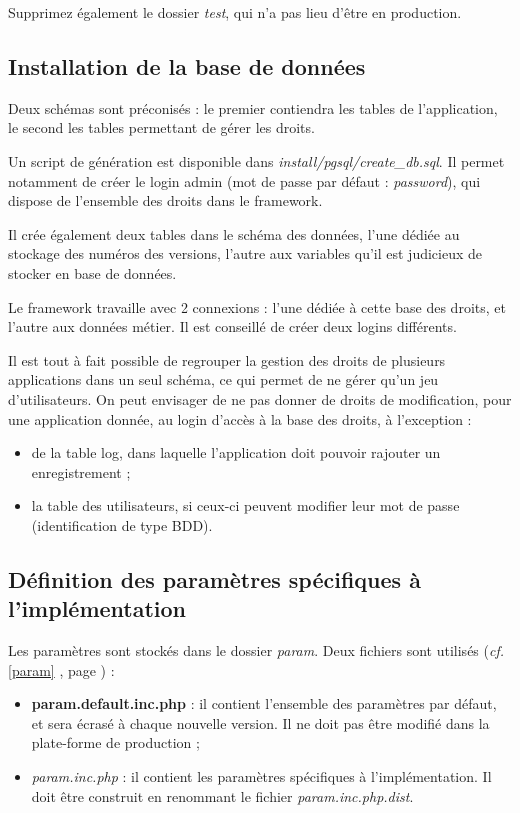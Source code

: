 Supprimez également le dossier \textit{test}, qui n'a pas lieu d'être en production.

\subsection{Installation de la base de données}

Deux schémas sont préconisés : le premier contiendra les tables de l'application, le second les tables permettant de gérer les droits.

Un script de génération est disponible dans \textit{install/pgsql/create\_db.sql}. Il permet notamment de créer le login admin (mot de passe par défaut : \textit{password}), qui dispose de l'ensemble des droits dans le framework.

Il crée également deux tables dans le schéma des données, l'une dédiée au stockage des numéros des versions, l'autre aux variables qu'il est judicieux de stocker en base de données.

Le framework travaille avec 2 connexions : l'une dédiée à cette base des droits, et l'autre aux données métier. Il est conseillé de créer deux logins différents.

Il est tout à fait possible de regrouper la gestion des droits de plusieurs applications dans un seul schéma, ce qui permet de ne gérer qu'un jeu d'utilisateurs. On peut envisager de ne pas donner de droits de modification, pour une application donnée, au login d'accès à la base des droits, à l'exception :
\begin{itemize}
\item de la table log, dans laquelle l'application doit pouvoir rajouter un enregistrement ;
\item la table des utilisateurs, si ceux-ci peuvent modifier leur mot de passe (identification de type BDD).
\end{itemize}

\subsection{Définition des paramètres spécifiques à l'implémentation}

Les paramètres sont stockés dans le dossier \textit{param}. Deux fichiers sont utilisés (\textit{cf.} \ref{param} \textit{}, page \pageref{param}) :
\begin{itemize}
\item \textbf{param.default.inc.php} : il contient l'ensemble des paramètres par défaut, et sera écrasé à chaque nouvelle version. Il ne doit pas être modifié dans la plate-forme de production ;
\item \textit{param.inc.php} : il contient les paramètres spécifiques à l'implémentation. Il doit être construit en renommant le fichier \textit{param.inc.php.dist}.
\end{itemize}

